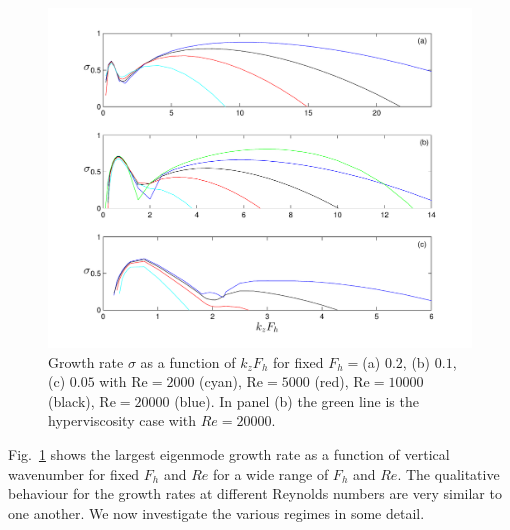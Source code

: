 \begin{figure}
\begin{center}
\includegraphics[width=\textwidth]{fixed_froude_varying_reynolds}
\caption{Growth rate $\sigma$ as a function of $k_{z}F_{h}$ for fixed $F_{h}=$(a) $0.2$, (b) $0.1$, (c) $0.05$ with Re$=2000$ (cyan), Re$=5000$ (red), Re$=10000$ (black), Re$=20000$ (blue). In panel (b) the green line is the hyperviscosity case with $Re=20000$.}
\label{FixFhVaryRe}
\end{center}
\end{figure}

Fig.~\ref{FixFhVaryRe} shows the largest eigenmode growth rate as a function of vertical wavenumber for fixed $F_{h}$ and $Re$ for a wide range of $F_{h}$ and $Re$. The qualitative behaviour for the growth rates at different Reynolds numbers are very similar to one another. We now investigate the various regimes in some detail.

